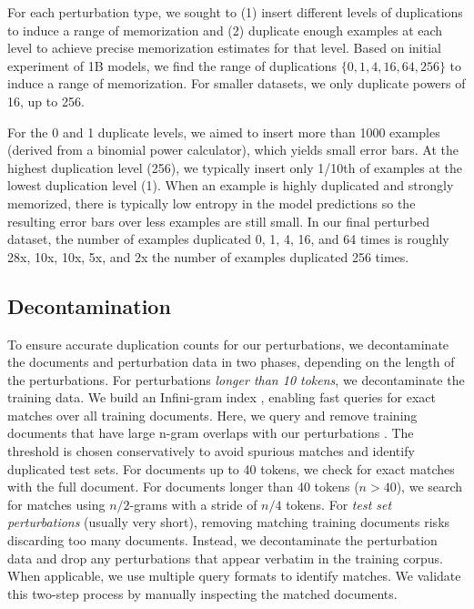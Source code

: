 \documentclass{article} %
\begin{document}
For each perturbation type, we sought to (1) insert different levels of duplications to induce a range of memorization and (2) duplicate enough examples at each level to achieve precise memorization estimates for that level. Based on initial experiment of 1B models, we find the range of duplications $\{0,1,4,16,64,256\}$ to induce a range of memorization. For smaller datasets, we only duplicate powers of 16, up to 256. 

For the 0 and 1 duplicate levels, we aimed to insert more than 1000 examples (derived from a binomial power calculator), which yields small error bars. At the highest duplication level (256), we typically insert only 1/10th of examples at the lowest duplication level (1). When an example is highly duplicated and strongly memorized, there is typically low entropy in the model predictions so the resulting error bars over less examples are still small. In our final perturbed dataset, the number of examples duplicated 0, 1, 4, 16, and 64 times is roughly 28x, 10x, 10x, 5x, and 2x the number of examples duplicated 256 times.





\subsection{Decontamination}
\label{app:decontamination}

To ensure accurate duplication counts for our perturbations, we decontaminate the documents and perturbation data in two phases, depending on the length of the perturbations. For perturbations \textit{longer than 10 tokens}, we decontaminate the training data. We build an Infini-gram index \citep{liu2024infinigram}, enabling fast queries for exact matches over all training documents. Here, we query and remove training documents that have large n-gram overlaps with our perturbations \citep[similar to][]{brown_2020_language}. The threshold is chosen conservatively to avoid spurious matches and identify duplicated test sets. For documents up to 40 tokens, we check for exact matches with the full document. For documents longer than 40 tokens ($n>40$), we search for matches using $n/2$-grams with a stride of $n/4$ tokens. For \textit{test set perturbations} (usually very short), removing matching training documents risks discarding too many documents. Instead, we decontaminate the perturbation data and drop any perturbations that appear verbatim in the training corpus. When applicable, we use multiple query formats to identify matches. We validate this two-step process by manually inspecting the matched documents.
\end{document}
